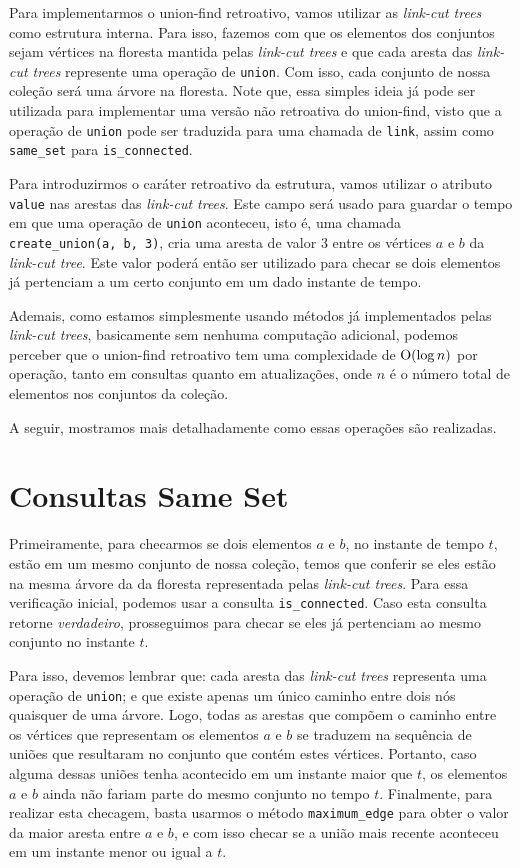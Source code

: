 Para implementarmos o union-find retroativo, vamos utilizar as \emph{link-cut trees} como estrutura interna. Para isso, fazemos com que os elementos dos conjuntos sejam vértices na floresta mantida pelas \emph{link-cut trees} e que cada aresta das \emph{link-cut trees} represente uma operação de \texttt{union}. Com isso, cada conjunto de nossa coleção será uma árvore na floresta. Note que, essa simples ideia já pode ser utilizada para implementar uma versão não retroativa do union-find, visto que a operação de \texttt{union} pode ser traduzida para uma chamada de \texttt{link}, assim como \texttt{same\_set} para \texttt{is\_connected}.

Para introduzirmos o caráter retroativo da estrutura, vamos utilizar o atributo \texttt{value} nas arestas das \emph{link-cut trees}. Este campo será usado para guardar o tempo em que uma operação de \texttt{union} aconteceu, isto é, uma chamada \texttt{create\_union(a, b, 3)}, cria uma aresta de valor $3$ entre os vértices $a$ e $b$ da \emph{link-cut tree}. Este valor poderá então ser utilizado para checar se dois elementos já pertenciam a um certo conjunto em um dado instante de tempo.

Ademais, como estamos simplesmente usando métodos já implementados pelas \emph{link-cut trees}, basicamente sem nenhuma computação adicional, podemos perceber que o union-find retroativo tem uma complexidade de $\mathrm{O}(\log n)$ por operação, tanto em consultas quanto em atualizações, onde $n$ é o número total de elementos nos conjuntos da coleção.

A seguir, mostramos mais detalhadamente como essas operações são realizadas.

\section{Consultas Same Set}
\label{sec:uf-same-set}

Primeiramente, para checarmos se dois elementos $a$ e $b$, no instante de tempo $t$, estão em um mesmo conjunto de nossa coleção, temos que conferir se eles estão na mesma árvore da da floresta representada pelas \emph{link-cut trees}. Para essa verificação inicial, podemos usar a consulta \texttt{is\_connected}. Caso esta consulta retorne \emph{verdadeiro}, prosseguimos para checar se eles já pertenciam ao mesmo conjunto no instante $t$.

Para isso, devemos lembrar que: cada aresta das \emph{link-cut trees} representa uma operação de \texttt{union}; e que existe apenas um único caminho entre dois nós quaisquer de uma árvore. Logo, todas as arestas que compõem o caminho entre os vértices que representam os elementos $a$ e $b$ se traduzem na sequência de uniões que resultaram no conjunto que contém estes vértices. Portanto, caso alguma dessas uniões tenha acontecido em um instante maior que $t$, os elementos $a$ e $b$ ainda não fariam parte do mesmo conjunto no tempo $t$. Finalmente, para realizar esta checagem, basta usarmos o método \texttt{maximum\_edge} para obter o valor da maior aresta entre $a$ e $b$, e com isso checar se a união mais recente aconteceu em um instante menor ou igual a $t$.

